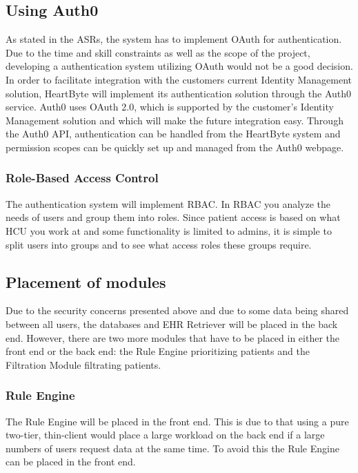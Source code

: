 \documentclass{article}
\begin{document}
\subsection{Using Auth0}
As stated in the ASRs, the system has to implement OAuth for authentication. Due to the time and skill constraints as well as the scope of the project, developing a authentication system utilizing OAuth would not be a good decision. In order to facilitate integration with the customers current Identity Management solution, HeartByte will implement its authentication solution through the Auth0 service. Auth0 uses OAuth 2.0, which is supported by the customer's Identity Management solution and which will make the future integration easy. Through the Auth0 API, authentication can be handled from the HeartByte system and permission scopes can be quickly set up and managed from the Auth0 webpage.

\subsubsection{Role-Based Access Control}
The authentication system will implement RBAC. In RBAC you analyze the needs of users and group them into roles. Since patient access is based on what HCU you work at and some functionality is limited to admins, it is simple to split users into groups and to see what access roles these groups require.

\subsection{Placement of modules}\label{placement-modules}
Due to the security concerns presented above and due to some data being shared between all users, the databases and EHR Retriever will be placed in the back end. However, there are two more modules that have to be placed in either the front end or the back end: the Rule Engine prioritizing patients and the Filtration Module filtrating patients.

\subsubsection{Rule Engine}
The Rule Engine will be placed in the front end. This is due to that using a pure two-tier, thin-client would place a large workload on the back end if a large numbers of users request data at the same time. To avoid this the Rule Engine can be placed in the front end. 
\end{document}
